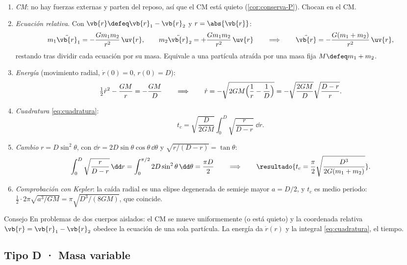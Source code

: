\begin{resolucion}
\begin{enumerate}
  \item \emph{CM}: no hay fuerzas externas y parten del reposo, así que el CM
  está quieto (\cref{cor:conserva-P}). Chocan en el CM.
  \item \emph{Ecuación relativa}. Con $\vb{r}\defeq\vb{r}_{1}-\vb{r}_{2}$ y $r=\abs{\vb{r}}$:
  \[
    m_{1}\ddot{\vb{r}}_{1}=-\frac{Gm_{1}m_{2}}{r^{2}}\,\uv{r},\qquad
    m_{2}\ddot{\vb{r}}_{2}=+\frac{Gm_{1}m_{2}}{r^{2}}\,\uv{r}
    \qquad\Longrightarrow\qquad
    \ddot{\vb{r}}=-\frac{G(m_{1}+m_{2})}{r^{2}}\,\uv{r},
  \]
  restando tras dividir cada ecuación por su masa. Equivale a una partícula
  atraída por una masa fija $M\defeq m_{1}+m_{2}$.
  \item \emph{Energía} (movimiento radial, $\dot r(0)=0$, $r(0)=D$):
  \[
    \tfrac12\dot r^{2}-\frac{GM}{r}=-\frac{GM}{D}
    \qquad\Longrightarrow\qquad
    \dot r=-\sqrt{2GM\Bigl(\frac1r-\frac1D\Bigr)}=-\sqrt{\frac{2GM}{D}}\sqrt{\frac{D-r}{r}} .
  \]
  \item \emph{Cuadratura} \eqref{eq:cuadratura}:
  \[
    t_{c}=\sqrt{\frac{D}{2GM}}\int_{0}^{D}\sqrt{\frac{r}{D-r}}\;\dd r .
  \]
  \item \emph{Cambio} $r=D\sin^{2}\theta$, con $\dd r=2D\sin\theta\cos\theta\,\dd\theta$ y
  $\sqrt{r/(D-r)}=\tan\theta$:
  \[
    \int_{0}^{D}\sqrt{\frac{r}{D-r}}\,\dd r=\int_{0}^{\pi/2}2D\sin^{2}\theta\,\dd\theta=\frac{\pi D}{2}
    \qquad\Longrightarrow\qquad
    \resultado{t_{c}=\frac{\pi}{2}\sqrt{\frac{D^{3}}{2G(m_{1}+m_{2})}}} .
  \]
  \item \emph{Comprobación con Kepler}: la caída radial es una elipse degenerada
  de semieje mayor $a=D/2$, y $t_{c}$ es medio periodo:
  $\tfrac12\cdot2\pi\sqrt{a^{3}/GM}=\pi\sqrt{D^{3}/(8GM)}$, que coincide.\qedhere
\end{enumerate}
\end{resolucion}

\begin{clave}[violeta]{Consejo}
En problemas de dos cuerpos aislados: el CM se mueve uniformemente (o está
quieto) y la coordenada relativa $\vb{r}=\vb{r}_{1}-\vb{r}_{2}$ obedece la ecuación de
una sola partícula. La energía da $\dot r(r)$ y la integral \eqref{eq:cuadratura}, el
tiempo.
\end{clave}

\subsection{Tipo D · Masa variable}

